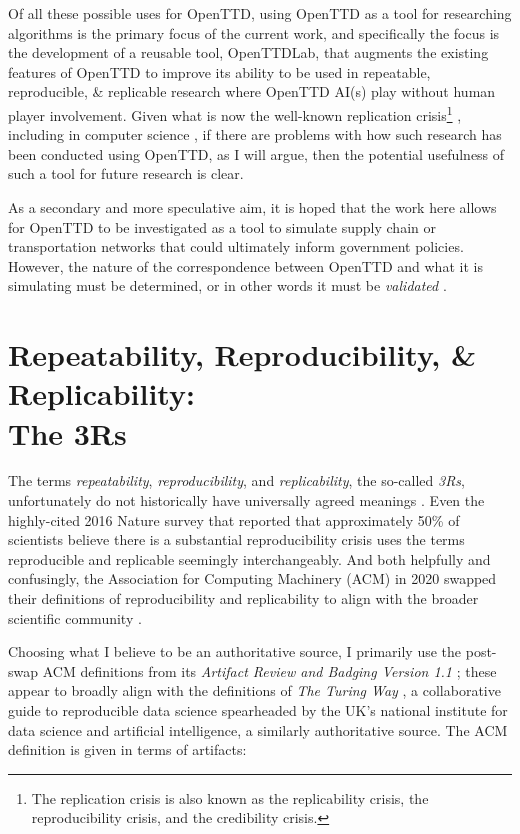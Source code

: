 \documentclass[logo,msc,dsti]{style/infthesis}    %
\newcommand{\singlespacedfootnote}[1]{{\singlespace\footnote{#1}}}
\begin{document}
Of all these possible uses for OpenTTD, using OpenTTD as a tool for researching algorithms is the primary focus of the current work, and specifically the focus is the development of a reusable tool, OpenTTDLab, that augments the existing features of OpenTTD to improve its ability to be used in repeatable, reproducible, \& replicable research where OpenTTD AI(s) play without human player involvement. Given what is now the well-known replication crisis\singlespacedfootnote{The replication crisis is also known as the replicability crisis, the reproducibility crisis, and the credibility crisis.} \cite{ioannidis2005most, baker20161}, including in computer science \cite{dalle2012reproducibility, CollbergChristianProebsting2016}, if there are problems with how such research has been conducted using OpenTTD, as I will argue, then the potential usefulness of such a tool for future research is clear.

As a secondary and more speculative aim, it is hoped that the work here allows for OpenTTD to be investigated as a tool to simulate supply chain or transportation networks that could ultimately inform government policies. However, the nature of the correspondence between OpenTTD and what it is simulating must be determined, or in other words it must be \emph{validated} \cite{doi:10.1177/1046878198291003}.

\section[Repeatability, Reproducibility, \& Replicability: The 3Rs]{Repeatability, Reproducibility, \& Replicability:\texorpdfstring{\\}{ }The 3Rs}
\label{section:define-3rs}

The terms \emph{repeatability}, \emph{reproducibility}, and \emph{replicability}, the so-called \emph{3Rs}, unfortunately do not historically have universally agreed meanings \cite{plesser_reproducibility_2018}. Even the highly-cited 2016 Nature survey that reported that approximately 50\% of scientists believe there is a substantial reproducibility crisis \cite{baker20161}  uses the terms reproducible and replicable seemingly interchangeably. And both helpfully and confusingly, the Association for Computing Machinery (ACM) in 2020 swapped their definitions of reproducibility and replicability to align with the broader scientific community \cite{association_for_computing_machiner_new_2020}.

Choosing what I believe to be an authoritative source, I primarily use the post-swap ACM definitions from its \emph{Artifact Review and Badging Version 1.1} \cite{association_for_computing_machiner_artifact_2020}; these appear to broadly align with the definitions of \emph{The Turing Way} \cite{turingway2022}, a collaborative guide to reproducible data science spearheaded by the UK's national institute for data science and artificial intelligence, a similarly authoritative source. The ACM definition is given in terms of artifacts:
\end{document}

